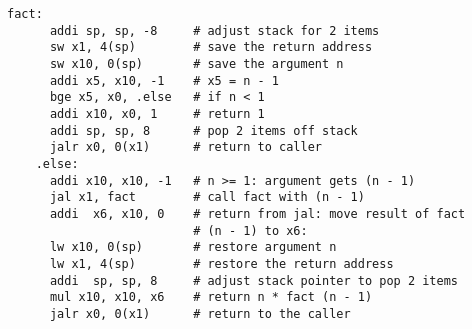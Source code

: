 \documentclass[varwidth]{standalone}
\begin{document}
  \begin{BVerbatim}[gobble=4]
    fact:
      addi sp, sp, -8     # adjust stack for 2 items
      sw x1, 4(sp)        # save the return address
      sw x10, 0(sp)       # save the argument n
      addi x5, x10, -1    # x5 = n - 1
      bge x5, x0, .else   # if n < 1
      addi x10, x0, 1     # return 1
      addi sp, sp, 8      # pop 2 items off stack
      jalr x0, 0(x1)      # return to caller
    .else:
      addi x10, x10, -1   # n >= 1: argument gets (n - 1)
      jal x1, fact        # call fact with (n - 1)
      addi  x6, x10, 0    # return from jal: move result of fact
                          # (n - 1) to x6:
      lw x10, 0(sp)       # restore argument n
      lw x1, 4(sp)        # restore the return address
      addi  sp, sp, 8     # adjust stack pointer to pop 2 items
      mul x10, x10, x6    # return n * fact (n - 1)
      jalr x0, 0(x1)      # return to the caller
  \end{BVerbatim}
\end{document}
